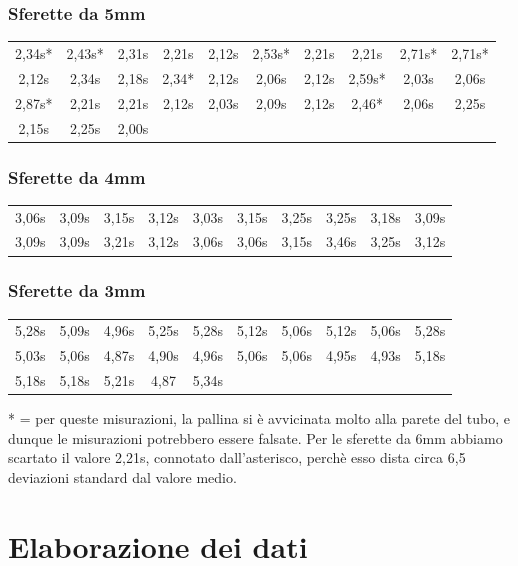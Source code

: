 \subsubsection{Sferette da 5mm}
\begin{tabular}{c|c|c|c|c|c|c|c|c|c}
\toprule
 2,34s* & 2,43s* & 2,31s & 2,21s & 2,12s & 2,53s* & 2,21s & 2,21s & 2,71s* & 2,71s* \\
 2,12s & 2,34s & 2,18s & 2,34* & 2,12s & 2,06s & 2,12s & 2,59s* & 2,03s & 2,06s \\
\midrule
 2,87s* & 2,21s & 2,21s & 2,12s & 2,03s & 2,09s & 2,12s & 2,46* & 2,06s & 2,25s \\
 2,15s & 2,25s & 2,00s &  &  &  &  &  &  & \\
\bottomrule
\end{tabular}
\subsubsection{Sferette da 4mm}
\begin{tabular}{c|c|c|c|c|c|c|c|c|c}
\toprule
 3,06s & 3,09s & 3,15s & 3,12s & 3,03s & 3,15s & 3,25s & 3,25s & 3,18s & 3,09s \\
 3,09s & 3,09s & 3,21s & 3,12s & 3,06s & 3,06s & 3,15s & 3,46s & 3,25s & 3,12s \\
\bottomrule
\end{tabular}
\subsubsection{Sferette da 3mm}

\begin{tabular}{c|c|c|c|c|c|c|c|c|c}
\toprule
 5,28s & 5,09s & 4,96s & 5,25s & 5,28s & 5,12s & 5,06s & 5,12s & 5,06s & 5,28s \\
 5,03s & 5,06s & 4,87s & 4,90s & 4,96s & 5,06s & 5,06s & 4,95s & 4,93s & 5,18s \\
 5,18s & 5,18s & 5,21s & 4,87 & 5,34s &  &  &  &  & \\
\bottomrule
\end{tabular}

* = per queste misurazioni, la pallina si è avvicinata molto alla parete del tubo, e dunque le misurazioni potrebbero essere falsate.
Per le sferette da 6mm abbiamo scartato il valore 2,21s, connotato dall'asterisco, perchè esso dista circa 6,5 deviazioni standard dal valore medio.

\section{Elaborazione dei dati}
